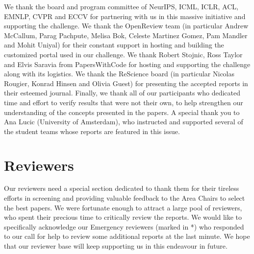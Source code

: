 We thank the board and program committee of NeurIPS, ICML, ICLR, ACL, EMNLP, CVPR and ECCV for partnering with us in this massive initiative and supporting the challenge. We thank the OpenReview team (in particular Andrew McCallum, Parag Pachpute, Melisa Bok, Celeste Martinez Gomez, Pam Mandler and Mohit Uniyal) for their constant support in hosting and building the customized portal used in our challenge. We thank Robert Stojnic, Ross Taylor and Elvis Saravia from PapersWithCode for hosting and supporting the challenge along with its logistics. We thank the ReScience board (in particular Nicolas Rougier, Konrad Hinsen and Olivia Guest) for presenting the accepted reports in their esteemed journal. Finally, we thank all of our participants who dedicated time and effort to verify results that were not their own, to help strengthen our understanding of the concepts presented in the papers.  A special thank you to Ana Lucic (University of Amsterdam), who instructed and supported several of the student teams whose reports are featured in this issue.

\section{Reviewers}

Our reviewers need a special section dedicated to thank them for their tireless efforts in screening and providing valuable feedback to the Area Chairs to select the best papers. We were fortunate enough to attract a large pool of reviewers, who spent their precious time to critically review the reports. We would like to specifically acknowledge  our Emergency reviewers (marked in *) who responded to our call for help to review some additional reports at the last minute. We hope that our reviewer base will keep supporting us in this endeavour in future.

